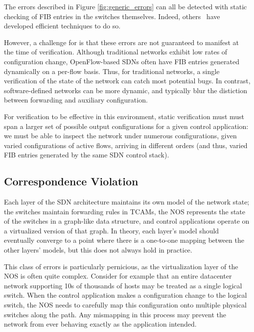 The errors described in Figure \ref{fig:generic_errors} can all be detected with static checking
of FIB entries in the switches themselves.
Indeed, others~\cite{anteater} have developed efficient techniques to do so.


However, a challenge for \projectname{} is that these errors are not guaranteed to manifest 
at the time of verification.
Although traditional networks exhibit
low rates of configuration change, OpenFlow-based SDNs often have FIB entries generated dynamically on a per-flow basis. 
Thus, for traditional networks, a single verification of the
state of the network can catch most potential bugs. 
In contrast, software-defined networks can be more dynamic, and typically blur
the distiction between forwarding and auxiliary configuration.

For verification to be effective in this environment, static verification must
must span a larger set of possible output configurations for a given control
application: we must be able to inspect the network under numerous configurations, given varied configurations of active flows, arriving in different orders (and thus, varied FIB entries generated by the same SDN control stack).


\subsection{Correspondence Violation}
\label{sec:correspond}
Each layer of the SDN architecture
maintains its own model of the network state; the switches maintain forwarding
rules in TCAMs, the NOS represents the state of the switches in a graph-like data
structure, and control applications operate on 
a virtualized version of that graph. In theory, each layer's model should eventually
converge to a point where there is a one-to-one mapping 
between the other layers' models, but this does not always hold in practice.

This class of errors is particularly pernicious, as the 
virtualization layer of the NOS is often quite complex. Consider for example
that an entire datacenter network supporting 10s of thousands of hosts may be
treated as a single logical switch. When the control application makes a
configuration change to the logical switch, the NOS needs to carefully map this
configuration onto multiple physical switches along the path. Any mismapping in this
process may prevent the network from ever behaving exactly as the application intended.


